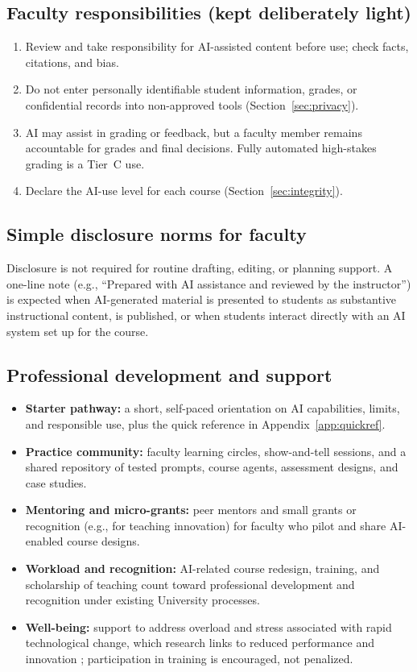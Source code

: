 \subsection{Faculty responsibilities (kept deliberately light)}
\begin{enumerate}
  \item Review and take responsibility for AI-assisted content before use; check facts, citations, and bias.
  \item Do not enter personally identifiable student information, grades, or confidential records into non-approved tools (Section~\ref{sec:privacy}).
  \item AI may assist in grading or feedback, but a faculty member remains accountable for grades and final decisions. Fully automated high-stakes grading is a Tier~C use.
  \item Declare the AI-use level for each course (Section~\ref{sec:integrity}).
\end{enumerate}

\subsection{Simple disclosure norms for faculty}
Disclosure is not required for routine drafting, editing, or planning support. A one-line note (e.g., ``Prepared with AI assistance and reviewed by the instructor'') is expected when AI-generated material is presented to students as substantive instructional content, is published, or when students interact directly with an AI system set up for the course.

\subsection{Professional development and support}
\begin{itemize}
  \item \textbf{Starter pathway:} a short, self-paced orientation on AI capabilities, limits, and responsible use, plus the quick reference in Appendix~\ref{app:quickref}.
  \item \textbf{Practice community:} faculty learning circles, show-and-tell sessions, and a shared repository of tested prompts, course agents, assessment designs, and case studies.
  \item \textbf{Mentoring and micro-grants:} peer mentors and small grants or recognition (e.g., for teaching innovation) for faculty who pilot and share AI-enabled course designs.
  \item \textbf{Workload and recognition:} AI-related course redesign, training, and scholarship of teaching count toward professional development and recognition under existing University processes.
  \item \textbf{Well-being:} support to address overload and stress associated with rapid technological change, which research links to reduced performance and innovation \citep{tarafdar2014}; participation in training is encouraged, not penalized.
\end{itemize}

